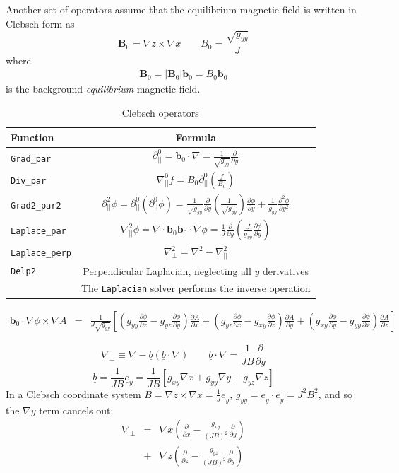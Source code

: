 \documentclass[12pt]{article}
\newcommand{\code}[1]{\texttt{#1}}
\newcommand{\deriv}[2]{\ensuremath{\frac{\partial #1}{\partial #2}}}
\begin{document}
Another set of operators assume that the equilibrium magnetic field is written
in Clebsch form as 
\[
\mathbf{B}_0 = \nabla z\times\nabla x \qquad B_0 = \frac{\sqrt{g_{yy}}}{J}
\]
%
where
%
\begin{align}
\mathbf{B}_0 = \left|\mathbf{B}_0\right|\mathbf{b}_0 = B_0 \mathbf{b}_0
\end{align}
%
is the background \emph{equilibrium} magnetic field.
%
\begin{table}[htb!]
\centering
\caption{Clebsch operators}
%
\label{tab:clebsch_operators}
%
\begin{tabular}{l c}
\hline
Function & Formula \\
\hline
\code{Grad\_par} & $\displaystyle\partial^0_{||} = \mathbf{b}_0\cdot\nabla =
\frac{1}{\sqrt{g_{yy}}}\deriv{}{y}$ \\
\code{Div\_par} & $\displaystyle \nabla^0_{||}f =
B_0\partial^0_{||}\left(\frac{f}{B_0}\right)$ \\
\code{Grad2\_par2} & $\displaystyle \partial^2_{||}\phi =
\partial^0_{||}\left(\partial^0_{||}\phi\right) =
\frac{1}{\sqrt{g_{yy}}}\deriv{}{y}\left(\frac{1}{\sqrt{g_{yy}}}\right)\deriv{
\phi}{y} + \frac{1}{g_{yy}}\frac{\partial^2\phi}{\partial y^2}$ \\
\code{Laplace\_par} & $\displaystyle \nabla_{||}^2\phi =
\nabla\cdot\mathbf{b}_0\mathbf{b}_0\cdot\nabla\phi =
\frac{1}{J}\deriv{}{y}\left(\frac{J}{g_{yy}}\deriv{\phi}{y}\right)$ \\
\code{Laplace\_perp} & $\displaystyle \nabla_\perp^2 = \nabla^2 - \nabla_{||}^2$
\\
\code{Delp2} & Perpendicular Laplacian, neglecting all $y$ derivatives \\
             & The \code{Laplacian} solver performs the inverse operation \\
\hline
\end{tabular}
%
\end{table}
\begin{eqnarray*}
\mathbf{b}_0\cdot\nabla\phi\times\nabla A &=& \frac{1}{J\sqrt{g_{yy}}}\left[\left(g_{yy}\deriv{\phi}{z} - g_{yz}\deriv{\phi}{y}\right)\deriv{A}{x} + \left(g_{yz}\deriv{\phi}{x} - g_{xy}\deriv{\phi}{z}\right)\deriv{A}{y} + \left(g_{xy}\deriv{\phi}{y} - g_{yy}\deriv{\phi}{x}\right)\deriv{A}{z}\right]
\end{eqnarray*}

\[
\nabla_\perp \equiv \nabla - \underline{b}\left(\underline{b}\cdot\nabla\right) \qquad \underline{b}\cdot\nabla = \frac{1}{JB}\frac{\partial}{\partial y}
\]
\[
\underline{b} = \frac{1}{JB}\underline{e}_y = \frac{1}{JB}\left[g_{xy}\nabla x + g_{yy}\nabla y + g_{yz}\nabla z\right]
\]
In a Clebsch coordinate system $\underline{B} = \nabla z \times \nabla x = \frac{1}{J}\underline{e}_y$, $g_{yy} = \underline{e}_y\cdot\underline{e}_y = J^2B^2$, and so the $\nabla y$ term cancels out:
\begin{eqnarray*}
\nabla_\perp &=& \nabla x\left(\deriv{}{x} - \frac{g_{xy}}{\left(JB\right)^2}\deriv{}{y}\right) \\
&+& \nabla z\left(\deriv{}{z} - \frac{g_{yz}}{\left(JB\right)^2}\deriv{}{y}\right)
\end{eqnarray*}
\end{document}
